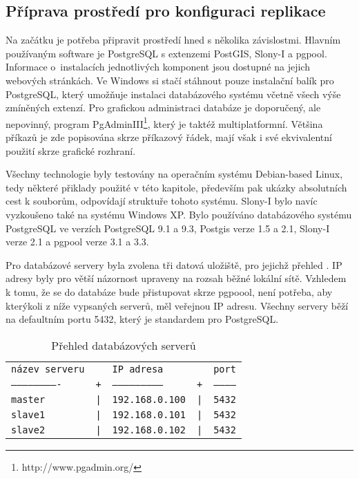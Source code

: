       \subsection{Příprava prostředí pro konfiguraci replikace}
      \label{kPriprava}
Na začátku je potřeba připravit prostředí hned s několika závislostmi. Hlavním používaným software je PostgreSQL s extenzemi PostGIS, Slony-I a pgpool. Informace o~instalacích jednotlivých komponent jsou dostupné na jejich webových stránkách. Ve Windows si stačí stáhnout pouze instalační balík pro PostgreSQL, který umožňuje instalaci databázového systému včetně všech výše zmíněných extenzí. Pro grafickou administraci databáze je doporučený, ale nepovinný, program \mbox{PgAdminIII}\footnote{http://www.pgadmin.org/}, který je taktéž multiplatformní. Většina příkazů je zde popisována skrze příkazový řádek, mají však i své ekvivalentní použití skrze grafické rozhraní.

Všechny technologie byly testovány na operačním systému Debian-based Linux, tedy některé přiklady použité v této kapitole, především pak ukázky absolutních cest k souborům, odpovídají struktuře tohoto systému. Slony-I bylo navíc vyzkoušeno také na systému Windows XP. Bylo používáno databázového systému PostgreSQL ve verzích PostgreSQL 9.1 a 9.3, Postgis verze 1.5 a 2.1, Slony-I verze 2.1 a pgpool verze 3.1 a 3.3.

Pro databázové servery byla zvolena tři datová uložiště, pro jejichž přehled . IP adresy byly pro větší názornost upraveny na rozsah běžné lokální sítě. Vzhledem k tomu, že se do databáze bude přistupovat skrze pgpoool, není potřeba, aby kterýkoli z níže vypsaných serverů, měl veřejnou IP adresu. Všechny servery běží na defaultním portu 5432, který je standardem pro PostgreSQL.

        \begin{table}[H]
          \caption[Přehled databázových serverů]{Přehled databázových serverů}
            \label{tServery}
            \begin{center}
            \begin{tabular}{lllll}
              \texttt{název serveru} & & \texttt{IP adresa} & & \texttt{port}\\
              \texttt{-------------------------} & \texttt{+} & \texttt{--------------------------} & \texttt{+} & \texttt{------------}\\
                                 \texttt{master} & \texttt{|} & \texttt{192.168.0.100} & \texttt{|} & \texttt{5432}\\
                                 \texttt{slave1} & \texttt{|} & \texttt{192.168.0.101} & \texttt{|} & \texttt{5432}\\
                                 \texttt{slave2} & \texttt{|} & \texttt{192.168.0.102} & \texttt{|} & \texttt{5432}\\
              \end{tabular}
            \end{center}
        \end{table}

